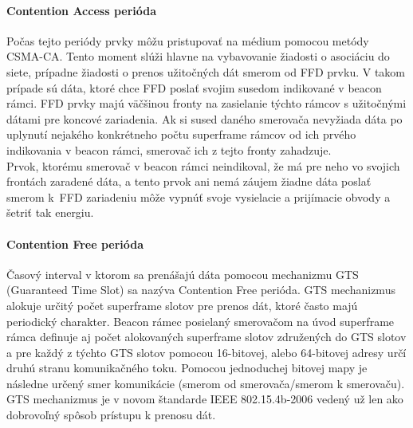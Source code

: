 \paragraph{Contention Access perióda}
Počas tejto periódy prvky môžu pristupovať na médium pomocou metódy CSMA-CA. Tento moment slúži hlavne na vybavovanie žiadosti o asociáciu do siete, prípadne žiadosti o prenos užitočných dát smerom od FFD prvku. V takom prípade sú dáta, ktoré chce FFD poslať svojim susedom indikované v beacon rámci. FFD prvky majú väčšinou fronty na zasielanie týchto rámcov s užitočnými dátami pre koncové zariadenia. Ak si sused daného smerovača nevyžiada dáta po uplynutí nejakého konkrétneho počtu superframe rámcov od ich prvého indikovania v beacon rámci, smerovač ich z tejto fronty zahadzuje.\\
\indent Prvok, ktorému smerovač v beacon rámci neindikoval, že má pre neho vo svojich frontách zaradené dáta, a tento prvok ani nemá záujem žiadne dáta poslať smerom k~FFD zariadeniu môže vypnúť svoje vysielacie a prijímacie obvody a šetriť tak energiu.\\
\paragraph{Contention Free perióda}
Časový interval v ktorom sa prenášajú dáta pomocou mechanizmu GTS (Guaranteed Time Slot) sa nazýva Contention Free perióda. GTS mechanizmus alokuje určitý počet superframe slotov pre prenos dát, ktoré často majú periodický charakter. Beacon rámec posielaný smerovačom na úvod superframe rámca definuje aj počet alokovaných superframe slotov združených do GTS slotov a pre každý z týchto GTS slotov pomocou 16-bitovej, alebo 64-bitovej adresy určí druhú stranu komunikačného toku. Pomocou jednoduchej bitovej mapy je následne určený smer komunikácie (smerom od smerovača/smerom k smerovaču). GTS mechanizmus je v novom štandarde IEEE 802.15.4b-2006 vedený už len ako dobrovoľný spôsob prístupu k prenosu dát.\\


